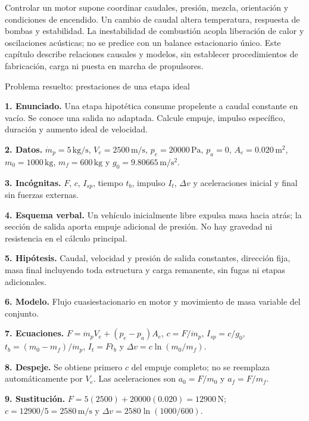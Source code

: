 Controlar un motor supone coordinar caudales, presión, mezcla, orientación y condiciones de encendido. Un cambio de caudal altera temperatura, respuesta de bombas y estabilidad. La inestabilidad de combustión acopla liberación de calor y oscilaciones acústicas; no se predice con un balance estacionario único. Este capítulo describe relaciones causales y modelos, sin establecer procedimientos de fabricación, carga ni puesta en marcha de propulsores.

\begin{studiumworked}{Problema resuelto: prestaciones de una etapa ideal}

\textbf{1. Enunciado.} Una etapa hipotética consume propelente a caudal constante en vacío. Se conoce una salida no adaptada. Calcule empuje, impulso específico, duración y aumento ideal de velocidad.

\textbf{2. Datos.} $\dot m_p=5\,\mathrm{kg/s}$, $V_e=2500\,\mathrm{m/s}$, $p_e=20000\,\mathrm{Pa}$, $p_a=0$, $A_e=0.020\,\mathrm{m^2}$, $m_0=1000\,\mathrm{kg}$, $m_f=600\,\mathrm{kg}$ y $g_0=9.80665\,\mathrm{m/s^2}$.

\textbf{3. Incógnitas.} $F$, $c$, $I_{sp}$, tiempo $t_b$, impulso $I_t$, $\Delta v$ y aceleraciones inicial y final sin fuerzas externas.

\textbf{4. Esquema verbal.} Un vehículo inicialmente libre expulsa masa hacia atrás; la sección de salida aporta empuje adicional de presión. No hay gravedad ni resistencia en el cálculo principal.

\textbf{5. Hipótesis.} Caudal, velocidad y presión de salida constantes, dirección fija, masa final incluyendo toda estructura y carga remanente, sin fugas ni etapas adicionales.

\textbf{6. Modelo.} Flujo cuasiestacionario en motor y movimiento de masa variable del conjunto.

\textbf{7. Ecuaciones.} $F=\dot m_pV_e+(p_e-p_a)A_e$, $c=F/\dot m_p$, $I_{sp}=c/g_0$, $t_b=(m_0-m_f)/\dot m_p$, $I_t=Ft_b$ y $\Delta v=c\ln(m_0/m_f)$.

\textbf{8. Despeje.} Se obtiene primero $c$ del empuje completo; no se reemplaza automáticamente por $V_e$. Las aceleraciones son $a_0=F/m_0$ y $a_f=F/m_f$.

\textbf{9. Sustitución.} $F=5(2500)+20000(0.020)=12900\,\mathrm{N}$; $c=12900/5=2580\,\mathrm{m/s}$ y $\Delta v=2580\ln(1000/600)$.


\end{studiumworked}
